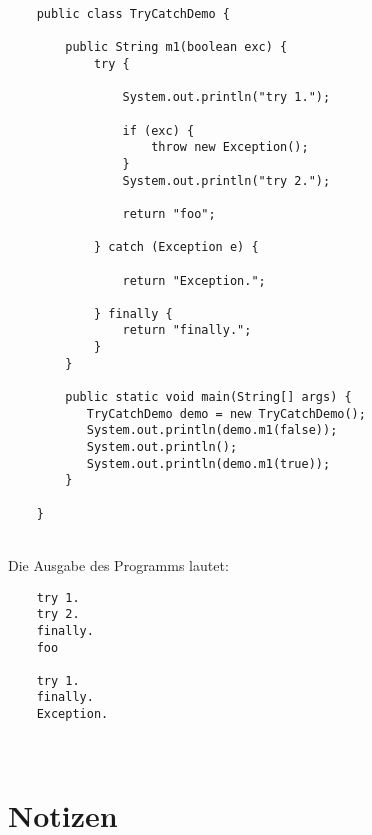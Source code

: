 \newpage
\begin{verbatim}
    public class TryCatchDemo {

        public String m1(boolean exc) {
            try {

                System.out.println("try 1.");

                if (exc) {
                    throw new Exception();
                }
                System.out.println("try 2.");

                return "foo";

            } catch (Exception e) {

                return "Exception.";

            } finally {
                return "finally.";
            }
        }

        public static void main(String[] args) {
           TryCatchDemo demo = new TryCatchDemo();
           System.out.println(demo.m1(false));
           System.out.println();
           System.out.println(demo.m1(true));
        }

    }
\end{verbatim}\\

\noindent
Die Ausgabe des Programms lautet:


\noindent
\begin{verbatim}
    try 1.
    try 2.
    finally.
    foo

    try 1.
    finally.
    Exception.
\end{verbatim}\\

\newpage











\newpage
\section*{Notizen}

\newpage
